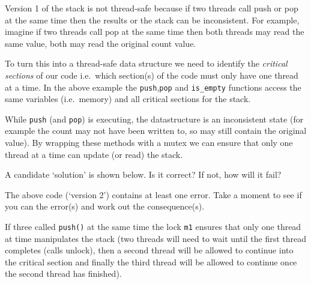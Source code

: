 Version 1 of the stack is not thread-safe because if two threads call
push or pop at the same time then the results or the stack can be
inconsistent. For example, imagine if two threads call pop at the same
time then both threads may read the same value, both may read the
original count value.

To turn this into a thread-safe data structure we need to identify the
\emph{critical sections} of our code i.e.~which section(s) of the code
must only have one thread at a time. In the above example the
\texttt{push},\texttt{pop} and \texttt{is\_empty} functions access the
same variables (i.e.~memory) and all critical sections for the stack.

While \texttt{push} (and \texttt{pop}) is executing, the datastructure
is an inconsistent state (for example the count may not have been
written to, so may still contain the original value). By wrapping these
methods with a mutex we can ensure that only one thread at a time can
update (or read) the stack.

A candidate `solution' is shown below. Is it correct? If not, how will
it fail?

\begin{Shaded}
\begin{Highlighting}[]
 
 

 
   
  
\end{Highlighting}
\end{Shaded}

The above code (`version 2') contains at least one error. Take a moment
to see if you can the error(s) and work out the consequence(s).

If three called \texttt{push()} at the same time the lock \texttt{m1}
ensures that only one thread at time manipulates the stack (two threads
will need to wait until the first thread completes (calls unlock), then
a second thread will be allowed to continue into the critical section
and finally the third thread will be allowed to continue once the second
thread has finished).

